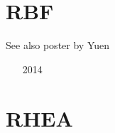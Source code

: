 

\section{RBF} 
See also poster by Yuen

\begin{small}
\begin{itemize}
\item[2014] \textcite{arfw14}
\end{itemize}
\end{small}

\section{RHEA}

\begin{small}
\begin{itemize}
\item[\twothousandeight]    \textcite{bugg08}
\item[\twothousandten]      \textcite{stgb10}
\item[\twothousandtwelve]   \textcite{algs12}
\item[\twothousandthirteen] \textcite{busa13}
\end{itemize}
\end{small}



